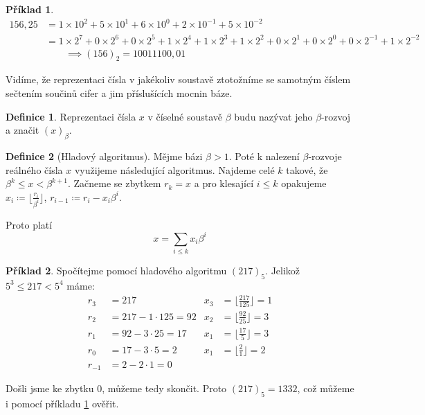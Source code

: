 \documentclass{article}
\theoremstyle{definition}
\newtheorem{example}{Příklad}
\theoremstyle{definition}
\newtheorem{definice}{Definice}[section]
\theoremstyle{remark}
\numberwithin{equation}{section}
\begin{document}
\begin{example} \label{ex:1}
	\begin{align*}
		156,25 & = 1 \times 10^2 + 5 \times 10^1 + 6 \times 10^0 + 2 \times 10^{-1} + 5 \times 10^{-2}                                                                       \\
		       & = 1 \times 2^7 + 0 \times 2^6 + 0 \times 2^5 + 1 \times 2^4 + 1 \times 2^3 + 1 \times 2^2 + 0 \times 2^1 + 0 \times 2^0 + 0 \times 2^{-1} + 1 \times 2^{-2} \\
		       & \quad \quad \implies (156)_2 = 10011100,01
	\end{align*}

	Vidíme, že reprezentaci čísla v jakékoliv soustavě ztotožníme se samotným číslem sečtením součinů cifer a jim příslušících mocnin báze.
\end{example}

\begin{definice}
	Reprezentaci čísla $x$ v číselné soustavě $\beta$ budu nazývat jeho $\beta$-rozvoj a značit $(x)_\beta$.
\end{definice}

\begin{definice}[Hladový algoritmus] \label{Greedy}
	Mějme bázi $\beta > 1$. Poté k nalezení $\beta$-rozvoje reálného čísla $x$ využijeme následující algoritmus. Najdeme celé $k$ takové, že $\beta^k \leq x < \beta^{k + 1}$. Začneme se zbytkem $r_k = x$ a pro klesající $i \leq k$ opakujeme $x_i \coloneq \lfloor \frac{r_i}{\beta^i} \rfloor$, $r_{i - 1} \coloneq r_i - x_i \beta^i$.

	Proto platí
	\begin{equation}
		x = \sum_{i \leq k} x_i \beta^i
	\end{equation}
\end{definice}

\begin{example}
	Spočítejme pomocí hladového algoritmu $(217)_5$. Jelikož $5^3 \leq 217 < 5^4$ máme:
	\begin{align*}
		r_3    & = 217                    & x_3 & = \lfloor \frac{217}{125} \rfloor = 1 \\
		r_2    & = 217 - 1 \cdot 125 = 92 & x_2 & = \lfloor \frac{92}{25} \rfloor = 3   \\
		r_1    & = 92 - 3 \cdot 25 = 17   & x_1 & = \lfloor \frac{17}{5} \rfloor = 3    \\
		r_0    & = 17 - 3 \cdot 5 = 2     & x_1 & = \lfloor \frac{2}{1} \rfloor = 2     \\
		r_{-1} & = 2 - 2 \cdot 1 = 0
	\end{align*}

	Došli jsme ke zbytku 0, můžeme tedy skončit. Proto $(217)_5 = 1332$, což můžeme i pomocí příkladu \ref{ex:1} ověřit.
\end{example}
\end{document}
